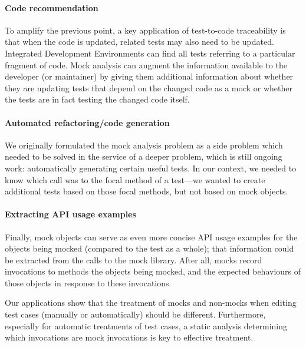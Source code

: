\paragraph{Code recommendation}
To amplify the previous point, a key application of test-to-code
traceability is that when the code is updated, related tests may also
need to be updated. Integrated Development Environments can find
all tests referring to a particular fragment of code. Mock analysis
can augment the information available to the developer (or maintainer) by
giving them additional information about whether they are updating
tests that depend on the changed code as a mock or whether the tests
are in fact testing the changed code itself.

\paragraph{Automated refactoring/code generation}
We originally formulated the mock analysis problem as a side problem which needed
to be solved in the service of a deeper problem, which is still
ongoing work: automatically generating certain useful tests. In our context,
we needed to know which call was to the focal method of a test---we
wanted to create additional tests based on those focal methods, but
not based on mock objects.

\paragraph{Extracting API usage examples}
Finally, mock objects can serve as even more concise API usage
examples for the objects being mocked (compared to the test as a whole);
that information could be extracted from the calls to
the mock library. After all, mocks record invocations to methods the objects
being mocked, and the expected behaviours of those objects in response to
these invocations.

Our applications show that the treatment of mocks and non-mocks
when editing test cases (manually or automatically) should be different.
Furthermore, especially for automatic treatments of test cases, a static
analysis determining which invocations are mock invocations is key to effective
treatment.

